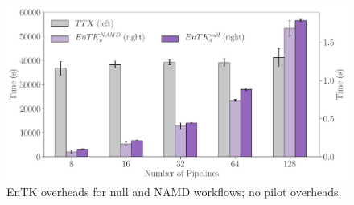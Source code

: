 
\begin{figure}[!htbp]
  \begin{minipage}[b]{0.49\textwidth}
  \centering
  \includegraphics[width=\textwidth]{FIGURES/namd_null_workload_overheads.pdf}
  \end{minipage}
  \caption{EnTK overheads for null and NAMD workflows; no pilot overheads.}\label{fig:namd_logs}
\end{figure}













